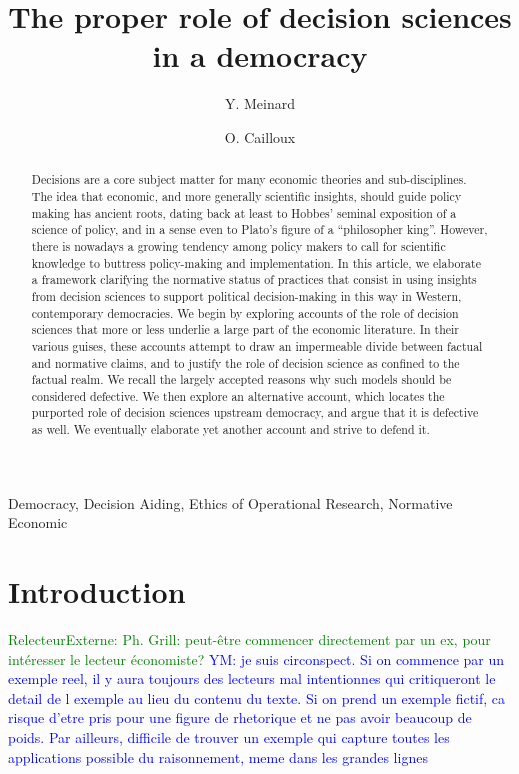 \documentclass[preprint,11pt]{elsarticle}
\newcommand{\commentYM}[1]{\textcolor{blue}{YM: #1}}
\newcommand{\commentE}[1]{\textcolor{green}{RelecteurExterne: #1}}
\begin{document}
\title{The proper role of decision sciences in a democracy}
\author[ld]{Y. Meinard}
\author[ld]{O. Cailloux}
\address[ld]{Universit\'e Paris-Dauphine, PSL Research University, CNRS, UMR [7243], LAMSADE, 75016 PARIS, FRANCE}



\begin{abstract}
Decisions are a core subject matter for many economic theories and sub-disciplines. The idea that economic, and more generally scientific insights, should guide policy making has ancient roots, dating back at least to Hobbes’ seminal exposition of a science of policy, and in a sense even to Plato's figure of a ``philosopher king''. However, there is nowadays a growing tendency among policy makers to call for scientific knowledge to buttress policy-making and implementation. In this article, we elaborate a framework clarifying the normative status of practices that consist in using insights from decision sciences to support political decision-making in this way in Western, contemporary democracies. We begin by exploring accounts of the role of decision sciences that more or less underlie a large part of the economic literature. In their various guises, these accounts attempt to draw an impermeable divide between factual and normative claims, and to justify the role of decision science as confined to the factual realm. We recall the largely accepted reasons why such models should be considered defective. We then explore an alternative account, which locates the purported role of decision sciences upstream democracy, and argue that it is defective as well. We eventually elaborate yet another account and strive to defend it.

\end{abstract}

\begin{keyword}
Democracy, Decision Aiding, Ethics of Operational Research, Normative Economic
\end{keyword}

\maketitle

\section{Introduction}

\commentE{Ph. Grill: peut-être commencer directement par un ex, pour intéresser le lecteur économiste?}
\commentYM{je suis circonspect. Si on commence par un exemple reel, il y aura toujours des lecteurs mal intentionnes qui critiqueront le detail de l exemple au lieu du contenu du texte. Si on prend un exemple fictif, ca risque d'etre pris pour une figure de rhetorique et ne pas avoir beaucoup de poids. Par ailleurs, difficile de trouver un exemple qui capture toutes les applications possible du raisonnement, meme dans les grandes lignes}
\end{document}
